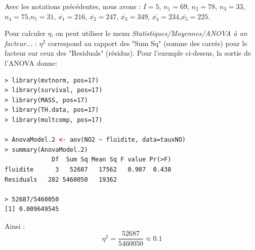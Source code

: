 Avec les notations précédentes, nous avons : $I = 5$, $n_{1} = 69$, $n_{2} = 78$, $n_{3} = 33$, $n_{4} = 75$,$n_{5} = 31$, $\bar{x_{1}} = 216$, $\bar{x_{2}} = 247$, $\bar{x_{3}} = 349$, $\bar{x_{4}} = 234$,$\bar{x_{5}} = 225$.

Pour calculer $\eta$, on peut utiliser le menu \textit{Statistiques/Moyennes/ANOVA à un facteur...} : $\eta^{2}$ correspond au rapport des "Sum Sq" (somme des carrés) pour le facteur sur ceux des "Residuals" (résidus).\newline
Pour l'exemple ci-dessus, la sortie de l'ANOVA donne:
\begin{lstlisting}[language=html]
> library(mvtnorm, pos=17)
> library(survival, pos=17)
> library(MASS, pos=17)
> library(TH.data, pos=17)
> library(multcomp, pos=17)

> AnovaModel.2 <- aov(NO2 ~ fluidite, data=tauxNO)
> summary(AnovaModel.2)
             Df  Sum Sq Mean Sq F value Pr(>F)
fluidite      3   52687   17562   0.907  0.438
Residuals   282 5460050   19362

> 52687/5460050
[1] 0.009649545
\end{lstlisting}
Ainsi :
$$\eta^{2} = \frac{52687}{5460050} \approx 0.1$$
